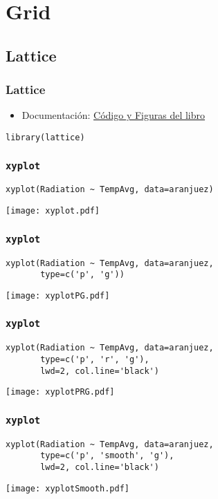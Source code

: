 \documentclass[xcolor={usenames,svgnames,dvipsnames}]{beamer}
\begin{document}
\section{Grid}
\label{sec-2}
\subsection{Lattice}
\label{sec-2-1}
\begin{frame}[fragile]
\frametitle{Lattice}
\label{sec-2-1-1}


\begin{itemize}
\item Documentación: \href{http://lmdvr.r-forge.r-project.org/figures/figures.html}{Código y Figuras del libro}
\end{itemize}


\lstset{language=R}
\begin{lstlisting}
library(lattice)
\end{lstlisting}
\end{frame}
\begin{frame}[fragile]
\frametitle{\texttt{xyplot}}
\label{sec-2-1-2}


\lstset{language=R}
\begin{lstlisting}
xyplot(Radiation ~ TempAvg, data=aranjuez)
\end{lstlisting}

\texttt{[image: xyplot.pdf]}
\end{frame}
\begin{frame}[fragile]
\frametitle{\texttt{xyplot}}
\label{sec-2-1-3}


\lstset{language=R}
\begin{lstlisting}
xyplot(Radiation ~ TempAvg, data=aranjuez,
       type=c('p', 'g'))
\end{lstlisting}

\texttt{[image: xyplotPG.pdf]}
\end{frame}
\begin{frame}[fragile]
\frametitle{\texttt{xyplot}}
\label{sec-2-1-4}


\lstset{language=R}
\begin{lstlisting}
xyplot(Radiation ~ TempAvg, data=aranjuez,
       type=c('p', 'r', 'g'),
       lwd=2, col.line='black')
\end{lstlisting}

\texttt{[image: xyplotPRG.pdf]}
\end{frame}
\begin{frame}[fragile]
\frametitle{\texttt{xyplot}}
\label{sec-2-1-5}


\lstset{language=R}
\begin{lstlisting}
xyplot(Radiation ~ TempAvg, data=aranjuez,
       type=c('p', 'smooth', 'g'),
       lwd=2, col.line='black')
\end{lstlisting}

\texttt{[image: xyplotSmooth.pdf]}
\end{frame}
\end{document}
